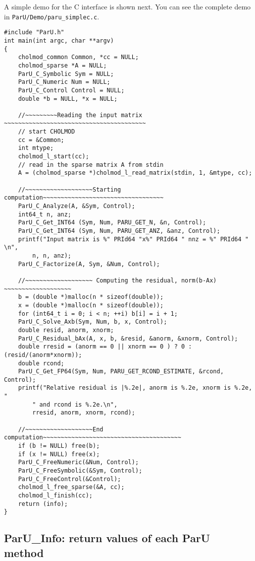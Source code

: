 \documentclass[12pt]{article}
\begin{document}
A simple demo for the C interface is shown next. You can see the complete demo
in \verb'ParU/Demo/paru_simplec.c'.

\begin{verbatim}
#include "ParU.h"
int main(int argc, char **argv)
{
    cholmod_common Common, *cc = NULL;
    cholmod_sparse *A = NULL;
    ParU_C_Symbolic Sym = NULL;
    ParU_C_Numeric Num = NULL;
    ParU_C_Control Control = NULL;
    double *b = NULL, *x = NULL;

    //~~~~~~~~~Reading the input matrix ~~~~~~~~~~~~~~~~~~~~~~~~~~~~~~~~~~~~~~~~
    // start CHOLMOD
    cc = &Common;
    int mtype;
    cholmod_l_start(cc);
    // read in the sparse matrix A from stdin
    A = (cholmod_sparse *)cholmod_l_read_matrix(stdin, 1, &mtype, cc);

    //~~~~~~~~~~~~~~~~~~~Starting computation~~~~~~~~~~~~~~~~~~~~~~~~~~~~~~~~~~
    ParU_C_Analyze(A, &Sym, Control);
    int64_t n, anz;
    ParU_C_Get_INT64 (Sym, Num, PARU_GET_N, &n, Control);
    ParU_C_Get_INT64 (Sym, Num, PARU_GET_ANZ, &anz, Control);
    printf("Input matrix is %" PRId64 "x%" PRId64 " nnz = %" PRId64 " \n",
        n, n, anz);
    ParU_C_Factorize(A, Sym, &Num, Control);

    //~~~~~~~~~~~~~~~~~~~ Computing the residual, norm(b-Ax) ~~~~~~~~~~~~~~~~~~~
    b = (double *)malloc(n * sizeof(double));
    x = (double *)malloc(n * sizeof(double));
    for (int64_t i = 0; i < n; ++i) b[i] = i + 1;
    ParU_C_Solve_Axb(Sym, Num, b, x, Control);
    double resid, anorm, xnorm;
    ParU_C_Residual_bAx(A, x, b, &resid, &anorm, &xnorm, Control);
    double rresid = (anorm == 0 || xnorm == 0 ) ? 0 : (resid/(anorm*xnorm));
    double rcond;
    ParU_C_Get_FP64(Sym, Num, PARU_GET_RCOND_ESTIMATE, &rcond, Control);
    printf("Relative residual is |%.2e|, anorm is %.2e, xnorm is %.2e, "
        " and rcond is %.2e.\n",
        rresid, anorm, xnorm, rcond);

    //~~~~~~~~~~~~~~~~~~~End computation~~~~~~~~~~~~~~~~~~~~~~~~~~~~~~~~~~~~~~~
    if (b != NULL) free(b);
    if (x != NULL) free(x);
    ParU_C_FreeNumeric(&Num, Control);
    ParU_C_FreeSymbolic(&Sym, Control);
    ParU_C_FreeControl(&Control);
    cholmod_l_free_sparse(&A, cc);
    cholmod_l_finish(cc);
    return (info);
}
\end{verbatim}

\subsection{{\sf ParU\_Info}: return values of each ParU method}
\end{document}

